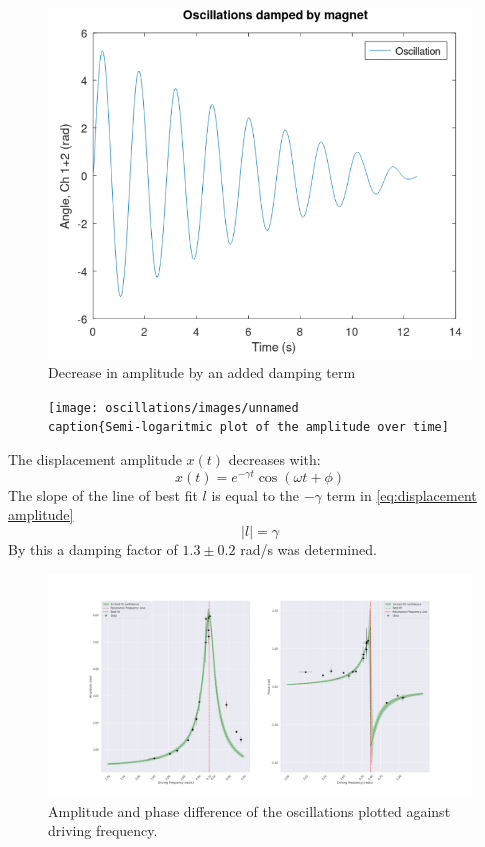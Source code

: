\begin{figure}[h!]
  \centering
  \includegraphics[width=1\textwidth]{oscillations/images/underdamped}
  \caption{Decrease in amplitude by an added damping term}
  \label{fig:underdamped}
\end{figure}

\begin{figure}[h!]
  \centering
  \texttt{[image: oscillations/images/unnamed
  \\caption\{Semi-logaritmic plot of the amplitude over time]}
  \label{fig:log of damping factor}
\end{figure}

The displacement amplitude $x(t)$ decreases with:
\begin{equation}
  x(t) = e^{-\gamma t} \cos(\omega t + \phi) 
  \label{eq:displacement amplitude}
\end{equation}
The slope of the line of best fit $l$ is equal to the $-\gamma$ term in \ref{eq:displacement amplitude}
\begin{equation}
  |l| = \gamma 
\end{equation}
By this a damping factor of $1.3 ± 0.2$ rad/s was determined.



\begin{figure}[H]
  \centering
  \includegraphics[width=1\textwidth]{oscillations/images/resonance}
  \caption{Amplitude and phase difference of the oscillations plotted against driving frequency.}
  \label{fig:resonance}
\end{figure}

